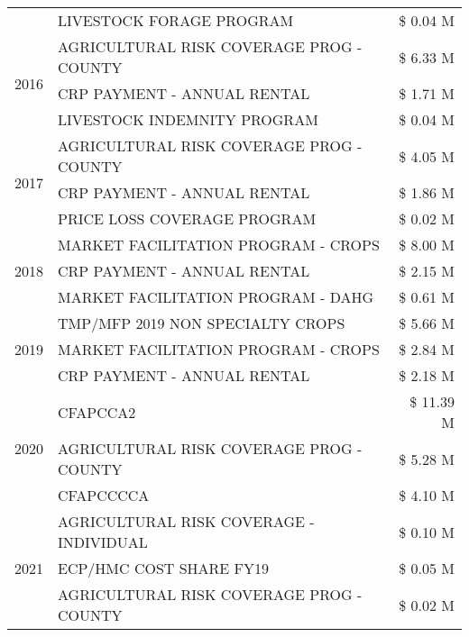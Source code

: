 \begin{tabular}{llr}
 & LIVESTOCK FORAGE PROGRAM & \$ 0.04 M \\
\cline{1-3}
\multirow[t]{3}{*}{2016} & AGRICULTURAL RISK COVERAGE PROG - COUNTY & \$ 6.33 M \\
 & CRP PAYMENT - ANNUAL RENTAL & \$ 1.71 M \\
 & LIVESTOCK INDEMNITY PROGRAM & \$ 0.04 M \\
\cline{1-3}
\multirow[t]{3}{*}{2017} & AGRICULTURAL RISK COVERAGE PROG - COUNTY & \$ 4.05 M \\
 & CRP PAYMENT - ANNUAL RENTAL & \$ 1.86 M \\
 & PRICE LOSS COVERAGE PROGRAM & \$ 0.02 M \\
\cline{1-3}
\multirow[t]{3}{*}{2018} & MARKET FACILITATION PROGRAM - CROPS & \$ 8.00 M \\
 & CRP PAYMENT - ANNUAL RENTAL & \$ 2.15 M \\
 & MARKET FACILITATION PROGRAM - DAHG & \$ 0.61 M \\
\cline{1-3}
\multirow[t]{3}{*}{2019} & TMP/MFP 2019 NON SPECIALTY CROPS & \$ 5.66 M \\
 & MARKET FACILITATION PROGRAM - CROPS & \$ 2.84 M \\
 & CRP PAYMENT - ANNUAL RENTAL & \$ 2.18 M \\
\cline{1-3}
\multirow[t]{3}{*}{2020} & CFAPCCA2 & \$ 11.39 M \\
 & AGRICULTURAL RISK COVERAGE PROG - COUNTY & \$ 5.28 M \\
 & CFAPCCCCA & \$ 4.10 M \\
\cline{1-3}
\multirow[t]{3}{*}{2021} & AGRICULTURAL RISK COVERAGE - INDIVIDUAL & \$ 0.10 M \\
 & ECP/HMC COST SHARE FY19 & \$ 0.05 M \\
 & AGRICULTURAL RISK COVERAGE PROG - COUNTY & \$ 0.02 M \\
\cline{1-3}
\bottomrule
\end{tabular}
